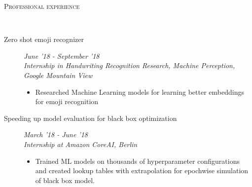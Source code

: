 \documentclass[9pt]{article}
\newenvironment{changemargin}[2]{%
  \begin{list}{}{%
      \setlength{\topsep}{0pt}%
    \setlength{\leftmargin}{#1}%
    \setlength{\rightmargin}{#2}%
    \setlength{\listparindent}{\parindent}%
  \setlength{\itemindent}{\parindent}%
    \setlength{\parsep}{\parskip}%
    }%
  \item[]}{\end{list}
    }
\newcommand{\lineover}{
  \begin{changemargin}{-0.05in}{-0.10in}
    \vspace*{-9pt}
    \hrulefill \\
    \vspace*{-2pt}
  \end{changemargin}
}
\newcommand{\header}[1]{
  \begin{changemargin}{-0.5in}{-0.5in}
    \scshape{#1}\\
        \lineover
  \end{changemargin}
}
\newenvironment{body} {
  \vspace*{-16pt}
        \begin{changemargin}{-0.6in}{-0.65in}
        }	
        {\end{changemargin}
}
\begin{document}
\header{Professional experience}
\begin{body}
  \vspace{14pt}
  
  \begin{description}
  	\item[\normalsize{Zero shot emoji recognizer}] \hfill 
  	\textit{June '18 - September '18} \\
  	\textit{Internship in Handwriting Recognition Research, Machine Perception, 
        Google Mountain View}
  \begin{itemize}
  	\item Researched Machine Learning models for learning better embeddings for emoji recognition
  \end{itemize}
  	
  \end{description}

  \begin{description}
    \item[\normalsize{Speeding up model evaluation for black box optimization}] 
      \hfill \textit{March '18 - June '18} \\
      \textit{Internship at Amazon CoreAI, Berlin}
      \begin{itemize}
        \item Trained ML models on thousands of hyperparameter configurations and created
          lookup tables with extrapolation for epochwise simulation of black box
          model.
      \end{itemize}



\end{description}
\end{body}
\end{document}
